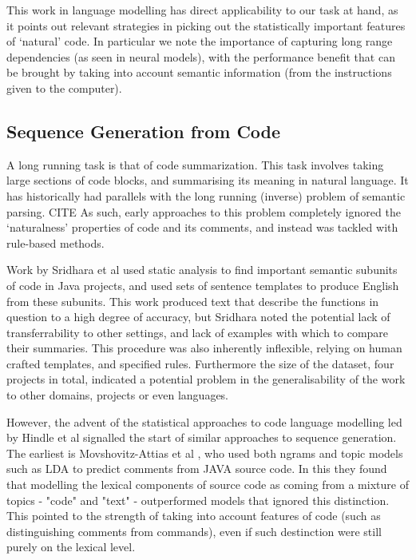 This work in language modelling has direct applicability to our task at hand, as it points out relevant strategies in picking out the statistically important features of `natural' code. In particular we note the importance of capturing long range dependencies (as seen in neural models), with the performance benefit that can be brought by taking into account semantic information (from the instructions given to the computer).

\subsection{Sequence Generation from Code}

A long running task is that of code summarization. 
This task involves taking large sections of code blocks, and summarising its meaning in natural language. It has historically had parallels with the long running (inverse) problem of semantic parsing. CITE
As such, early approaches to this problem completely ignored the `naturalness' properties of code and its comments, and instead was tackled with rule-based methods. 

Work by Sridhara et al \cite{sridhara_[not_2010}  used static analysis to find important semantic subunits of code in Java projects, and used sets of sentence templates to produce English from these subunits.
This work produced text that describe the functions in question to a high degree of accuracy, but Sridhara noted the potential lack of transferrability to other settings, and lack of examples with which to compare their summaries.  
This procedure was also inherently inflexible, relying on human crafted templates, and specified rules. Furthermore the size of the dataset, four projects in total, indicated a potential problem in the generalisability of the work to other domains, projects or even languages.

However, the advent of the statistical approaches to code language modelling led by Hindle et al \cite{Hindle:2012:NS:2337223.2337322} signalled the start of similar approaches to sequence generation. The earliest is Movshovitz-Attias et al \cite{movshovitz-attias_natural_nodate}, who used both ngrams and topic models such as LDA to predict comments from JAVA source code. In this they found that modelling the lexical components of source code as coming from a mixture of topics - "code" and "text" - outperformed models that ignored this distinction.  This pointed to the strength of taking into account features of code (such as distinguishing comments from commands), even if such destinction were still purely on the lexical level.

